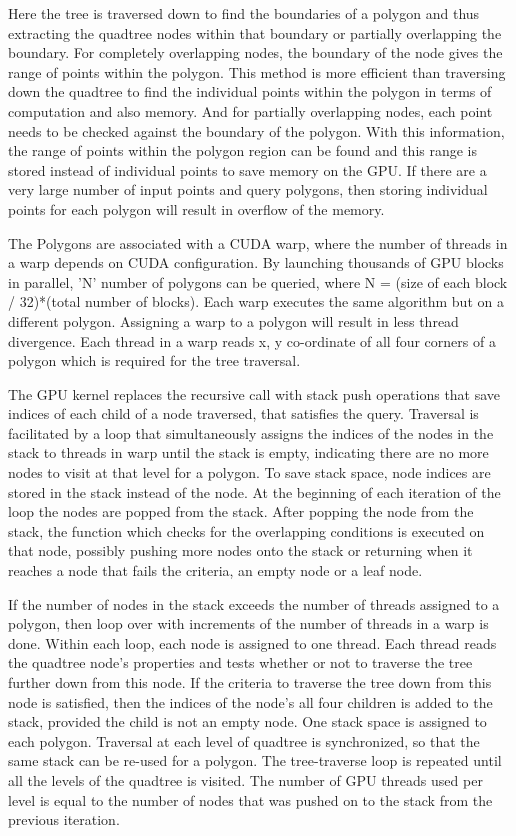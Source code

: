 Here the tree is traversed down to find the boundaries of a polygon and thus extracting the quadtree nodes within that boundary or partially overlapping the boundary. For completely overlapping nodes, the boundary of the node gives the range of points within the polygon. This method is more efficient than traversing down the quadtree to find the individual points within the polygon in terms of computation and also memory. And for partially overlapping nodes, each point needs to be checked against the boundary of the polygon. With this information, the range of points within the polygon region can be found and this range is stored instead of individual points to save memory on the GPU. If there are a very large number of input points and query polygons, then storing individual points for each polygon will result in overflow of the memory. 

The Polygons are associated with a CUDA warp, where the number of threads in a warp depends on CUDA configuration. By launching thousands of GPU blocks in parallel, 'N' number of polygons can be queried, where N = (size of each block / 32)*(total number of blocks).  Each warp executes the same algorithm but on a different polygon. Assigning a warp to a polygon will result in less thread divergence. Each thread in a warp reads x, y co-ordinate of all four corners of a polygon which is required for the tree traversal.

The GPU kernel replaces the recursive call with stack push operations that save indices of each child of a node traversed, that satisfies the query. Traversal is facilitated by a loop that simultaneously assigns the indices of the nodes in the stack to threads in warp until the stack is empty, indicating there are no more nodes to visit at that level for a polygon. To save stack space, node indices are stored in the stack instead of the node. At the beginning of each iteration of the loop the nodes are popped from the stack. After popping the node from the stack, the function which checks for the overlapping conditions is executed on that node, possibly pushing more nodes onto the stack or returning when it reaches a node that fails the criteria, an empty node or a leaf node.

If the number of nodes in the stack exceeds the number of threads assigned to a polygon, then loop over with increments of the number of threads in a warp is done. Within each loop, each node is assigned to one thread.
Each thread reads the quadtree node's properties and tests whether or not to traverse the tree further down from this node. If the criteria to traverse the tree down from this node is satisfied, then the indices of the node's all four children is added to the stack, provided the child is not an empty node. One stack space is assigned to each polygon. Traversal at each level of quadtree is synchronized, so that the same stack can be re-used for a polygon. The tree-traverse loop is repeated until all the levels of the quadtree is visited.
The number of GPU threads used per level is equal to the number of nodes that was pushed on to the stack from the previous iteration.

